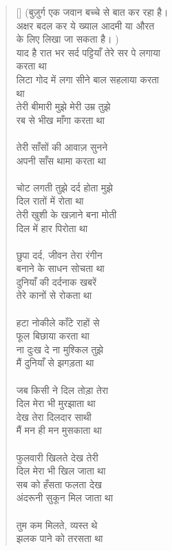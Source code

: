 \begin{verse}[\versewidth]\texthindi{
(बुज़ुर्ग एक जवान बच्चे से बात कर रहा है।\\
अक्षर बदल कर ये ख्याल आदमी या औरत\\
के लिए लिखा जा सकता है।
)\\
याद है रात भर सर्द पट्टियाँ तेरे सर पे लगाया\\
करता था\\
लिटा गोद में लगा सीने बाल सहलाया करता\\
था\\
तेरी बीमारी मुझे मेरी उम्र तुझे\\
रब से भीख माँगा करता था\\
\\
तेरी साँसों की आवाज़ सुनने\\
अपनी साँस थामा करता था\\
\\
चोट लगती तुझे दर्द होता मुझे\\
दिल रातों में रोता था\\
तेरी खुशी के खज़ाने बना मोती\\
दिल में हार पिरोता था\\
\\
छुपा दर्द, जीवन तेरा रंगीन\\
बनाने के साधन सोचता था\\
दुनियाँ की दर्दनाक खबरें\\
तेरे कानों से रोकता था\\
\\
हटा नोकीले काँटे राहों से\\
फूल बिछाया करता था\\
ना दुःख दे ना मुश्किल तुझे\\
मैं दुनियाँ से झगड़ता था\\
\\
जब किसी ने दिल तोड़ा तेरा\\
दिल मेरा भी मुरझाता था\\
देख तेरा दिलदार साथी\\
मैं मन ही मन मुसकाता था\\
\\
फुलवारी खिलते देख तेरी\\
दिल मेरा भी खिल जाता था\\
सब को हँसता फलता देख\\
अंदरूनी सुकून मिल जाता था\\
\\
तुम कम मिलते, व्यस्त थे\\
झलक पाने को तरसता था\\
}
\end{verse}
